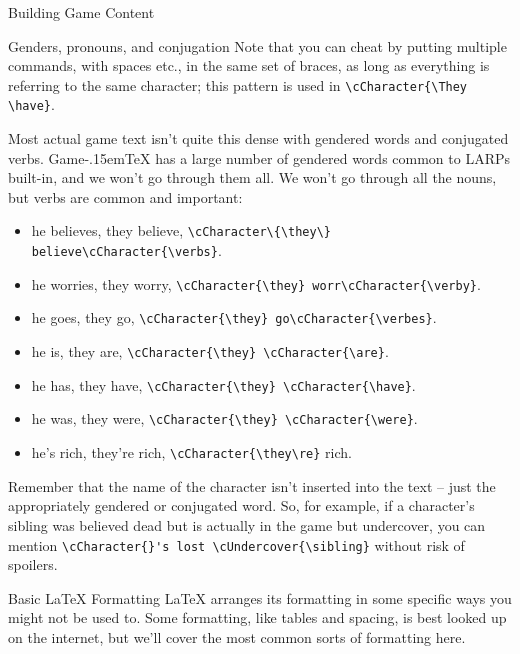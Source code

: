 \documentclass[11pt,  total={6in, 8in}]{article}
\def\gametex{\mbox{Game\kern-.15em\TeX}}
\begin{document}
\begin{section}{Building Game Content}
\begin{subsection}{Genders, pronouns, and conjugation}
Note that you can cheat by putting multiple commands, with spaces etc., in the same set of braces, as long as everything is referring to the same character; this pattern is used in \lstinline|\cCharacter{\They \have}|.

Most actual game text isn't quite this dense with gendered words and conjugated verbs.  \gametex{} has a large number of gendered words common to LARPs built-in, and we won't go through them all.  We won't go through all the nouns, but verbs are common and important:

\begin{itemize}
\item he believes, they believe, \lstinline|\cCharacter\{\they\} believe\cCharacter{\verbs}|.
\item he worries, they worry, \lstinline|\cCharacter{\they} worr\cCharacter{\verby}|.
\item he goes, they go, \lstinline|\cCharacter{\they} go\cCharacter{\verbes}|.
\item he is, they are, \lstinline|\cCharacter{\they} \cCharacter{\are}|.
\item he has, they have, \lstinline|\cCharacter{\they} \cCharacter{\have}|.
\item he was, they were, \lstinline|\cCharacter{\they} \cCharacter{\were}|.
\item he's rich, they're rich, \lstinline|\cCharacter{\they\re}| rich.
\end{itemize}

Remember that the name of the character isn't inserted into the text – just the appropriately gendered or conjugated word.  So, for example, if a character's sibling was believed dead but is actually in the game but undercover, you can mention \lstinline|\cCharacter{}'s lost \cUndercover{\sibling}| without risk of spoilers.

\end{subsection}
\begin{subsection}{Basic \LaTeX{} Formatting}
LaTeX arranges its formatting in some specific ways you might not be used to.  Some formatting, like tables and spacing, is best looked up on the internet, but we'll cover the most common sorts of formatting here.


\end{subsection}
\end{section}
\end{document}
